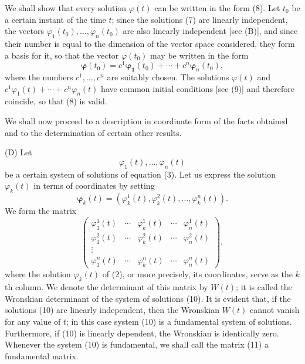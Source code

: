 \documentclass[10pt,a5paper]{book}
\theoremstyle{plain}
\theoremstyle{definition}
\theoremstyle{remark}
\begin{document}
We shall show that every solution $\varphi(t)$ can be written in the form (8). Let $t_{0}$ be a certain instant of the time $t$; since the solutions (7) are linearly independent, the vectors $\varphi_{1}\left(t_{0}\right), \ldots, \varphi_{n}\left(t_{0}\right)$ are also linearly independent [see (B)], and since their number is equal to the dimension of the vector space considered, they form a basis for it, so that the vector $\varphi\left(t_{0}\right)$ may be written in the form
\begin{equation*}
\boldsymbol{\varphi}\left(t_{0}\right)=c^{1} \boldsymbol{\varphi}_{\mathbf{1}}\left(t_{0}\right)+\cdots+c^{n} \boldsymbol{\varphi}_{n}\left(t_{0}\right), \tag{9}
\end{equation*}
where the numbers $c^{1}, \ldots, c^{n}$ are suitably chosen. The solutions $\varphi(t)$ and $c^{1} \varphi_{1}(t)+\cdots+c^{n} \varphi_{n}(t)$ have common initial conditions [see (9)] and therefore coincide, so that (8) is valid.

We shall now proceed to a description in coordinate form of the facts obtained and to the determination of certain other results.

(D) Let
\begin{equation*}
\varphi_{1}(t), \ldots, \varphi_{n}(t) \tag{10}
\end{equation*}
be a certain system of solutions of equation (3). Let us express the solution $\varphi_{k}(t)$ in terms of coordinates by setting
\[
\boldsymbol{\varphi}_{k}(t)=\left(\varphi_{k}^{1}(t), \varphi_{k}^{2}(t), \ldots, \varphi_{k}^{n}(t)\right) .
\]
We form the matrix
\[
\left(\begin{array}{ccccc}
\varphi_{1}^{1}(t) & \cdots & \varphi_{k}^{1}(t) & \cdots & \varphi_{n}^{1}(t)  \tag{11}\\
\varphi_{1}^{2}(t) & \cdots & \varphi_{k}^{2}(t) & \cdots & \varphi_{n}^{2}(t) \\
\vdots & & & & \\
\varphi_{1}^{n}(t) & \cdots & \varphi_{k}^{n}(t) & \cdots & \varphi_{n}^{n}(t)
\end{array}\right),
\]
where the solution $\varphi_{k}(t)$ of (2), or more precisely, its coordinates, serve as the $k$ th column. We denote the determinant of this matrix by $W(t)$; it is called the Wronskian determinant of the system of solutions (10). It is evident that, if the solutions (10) are linearly independent, then the Wronskian $W(t)$ cannot vanish for any value of $t$; in this case system (10) is a fundamental system of solutions. Furthermore, if (10) is linearly dependent, the Wronskian is identically zero. Whenever the system (10) is fundamental, we shall call the matrix (11) a fundamental matrix.
\end{document}
